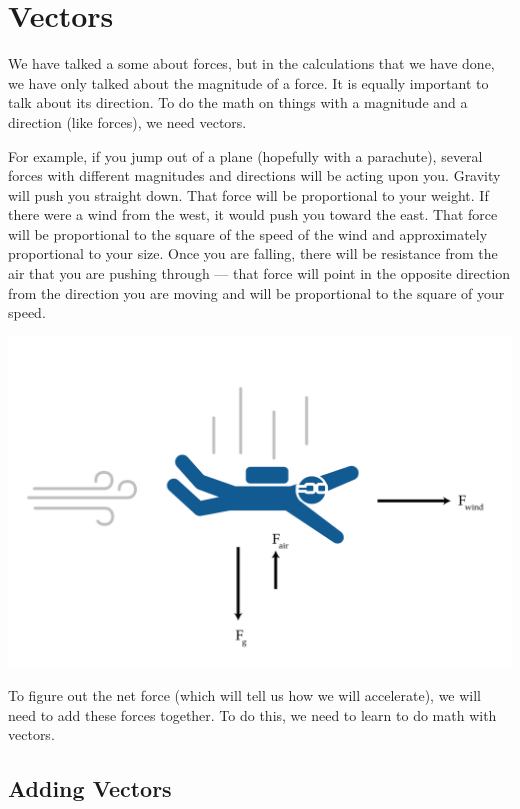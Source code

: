\chapter{Vectors}

We have talked a some about forces, but in the calculations that we
have done, we have only talked about the magnitude of a force. It is
equally important to talk about its direction. To do the math on
things with a magnitude and a direction (like forces), we need vectors.

For example, if you jump out of a plane (hopefully with a parachute), 
several forces with different magnitudes and directions will be acting upon 
you. Gravity will push you straight down. That force will be proportional to your weight.
If there were a wind from the west, it would push you toward the east. That force
will be proportional to the square of the speed of the wind and approximately proportional to 
your size. Once you are falling, there will be resistance from the air 
that you are pushing through --- that force will point in the opposite direction
from the direction you are moving and will be proportional to the square of your
speed.

\includegraphics[width=1\textwidth]{skydiver.png}


To figure out the net force (which will tell us how we will accelerate), we will 
need to add these forces together. To do this, we need to learn to do math with vectors.

\section{Adding Vectors}

